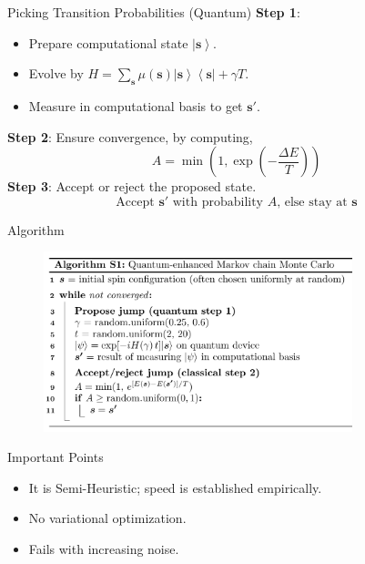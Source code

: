\documentclass[
    10pt,
    aspectratio=169,
]{beamer}
\begin{document}
\begin{frame}{Picking Transition Probabilities (Quantum)}
    \textbf{Step 1}:
    \begin{itemize}
        \item Prepare computational state \(\left|\mathbf{s}\right\rangle\).
        \item Evolve by \(H=\sum_{\mathbf{s}}\mu(\mathbf{s})\left|\mathbf{s}\right\rangle\left\langle\mathbf{s}\right|+\gamma T\).
        \item Measure in computational basis to get \(\mathbf{s'}\).
    \end{itemize}
    \textbf{Step 2}: Ensure convergence, by computing,
    \[A=\min\left(1,\exp{\left(-\frac{\Delta E}{T}\right)}\right)\]
    \textbf{Step 3}: Accept or reject the proposed state.
    \[\text{Accept }\mathbf{s'}\text{ with probability }A\text{, else stay at }\mathbf{s}\]
\end{frame}

\begin{frame}{Algorithm}
    \begin{figure}
        \centering
        \includegraphics[width=0.8\textwidth]{4.png}
    \end{figure}
\end{frame}

\begin{frame}{Important Points}
    \begin{itemize}
        \item It is Semi-Heuristic; speed is established empirically.
        \item No variational optimization.
        \item Fails with increasing noise.
    \end{itemize}
\end{frame}
\end{document}
